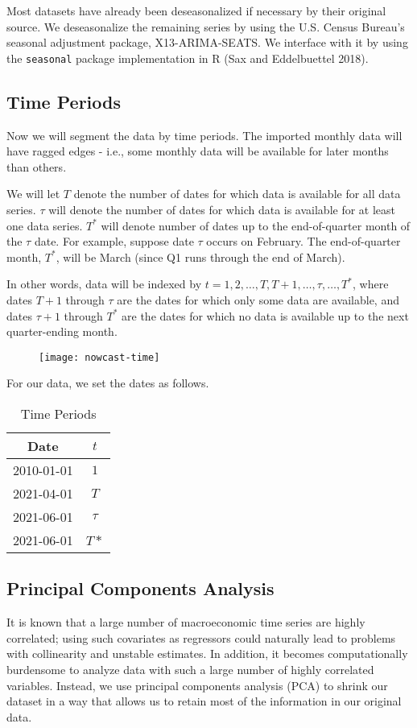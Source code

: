 \documentclass[11pt, letterpaper]{article}\usepackage[]{graphicx}\usepackage[]{color}
\begin{document}
Most datasets have already been deseasonalized if necessary by their original source. We deseasonalize the remaining series by using the U.S. Census Bureau's seasonal adjustment package, X13-ARIMA-SEATS. We interface with it by using the \texttt{seasonal} package implementation in R (Sax and Eddelbuettel 2018).

\subsection{Time Periods}
Now we will segment the data by time periods. The imported monthly data will have ragged edges - i.e., some monthly data will be available for later months than others.

We will let $T$ denote the number of dates for which data is available for all data series. $\tau$ will denote the number of dates for which data is available for at least one data series. $T^*$ will denote number of dates up to the end-of-quarter month of the $\tau$ date. For example, suppose date $\tau$ occurs on February. The end-of-quarter month, $T^*$, will be March (since Q1 runs through the end of March). 

In other words, data will be indexed by $t = 1, 2, \dots, T, T+1, \dots, \tau, \dots, T^*$, where dates $T + 1$ through $\tau$ are the dates for which only some data are available, and dates $\tau + 1$ through $T^*$ are the dates for which no data is available up to the next quarter-ending month.
\begin{figure}[H]
\texttt{[image: nowcast-time]}
\centering
\end{figure}
For our data, we set the dates as follows.
\begin{table}[H]
\centering
\begingroup\footnotesize
\begin{tabular}{cc}
  \hline
Date & $t$ \\ 
  \hline
2010-01-01 & $1$ \\ 
  2021-04-01 & $T$ \\ 
  2021-06-01 & $\tau$ \\ 
  2021-06-01 & $T*$ \\ 
   \hline
\end{tabular}
\endgroup
\caption{Time Periods} 
\end{table}


\subsection{Principal Components Analysis}
It is known that a large number of macroeconomic time series are highly correlated; using such covariates as regressors could naturally lead to problems with collinearity and unstable estimates. In addition, it becomes computationally burdensome to analyze data with such a large number of highly correlated variables. Instead, we use principal components analysis (PCA) to shrink our dataset in a way that allows us to retain most of the information in our original data.
\end{document}
